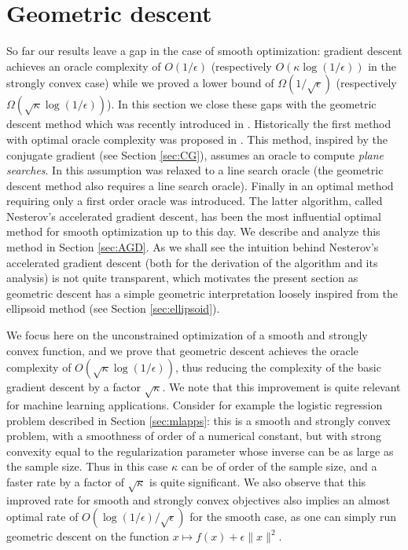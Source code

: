 \section{Geometric descent} \label{sec:GeoD}
So far our results leave a gap in the case of smooth optimization: gradient descent achieves an oracle complexity of $O(1/\epsilon)$ (respectively $O(\kappa \log(1/\epsilon))$ in the strongly convex case) while we proved a lower bound of $\Omega(1/\sqrt{\epsilon})$ (respectively $\Omega(\sqrt{\kappa} \log(1/\epsilon))$). In this section we close these gaps with the geometric descent method which was recently introduced in \cite{BLS15}. Historically the first method with optimal oracle complexity was proposed in \cite{NY83}. This method, inspired by the conjugate gradient (see Section \ref{sec:CG}), assumes an oracle to compute {\em plane searches}. In \cite{Nem82} this assumption was relaxed to a line search oracle (the geometric descent method also requires a line search oracle). Finally in \cite{Nes83} an optimal method requiring only a first order oracle was introduced. The latter algorithm, called Nesterov's accelerated gradient descent, has been the most influential optimal method for smooth optimization up to this day. We describe and analyze this method in Section \ref{sec:AGD}. As we shall see the intuition behind Nesterov's accelerated gradient descent (both for the derivation of the algorithm and its analysis) is not quite transparent, which motivates the present section as geometric descent has a simple geometric interpretation loosely inspired from the ellipsoid method (see Section \ref{sec:ellipsoid}).

We focus here on the unconstrained optimization of a smooth and strongly convex function, and we prove that geometric descent achieves the oracle complexity of $O(\sqrt{\kappa} \log(1/\epsilon))$, thus reducing the complexity of the basic gradient descent by a factor $\sqrt{\kappa}$. We note that this improvement is quite relevant for machine learning applications. Consider for example the logistic regression problem described in Section \ref{sec:mlapps}: this is a smooth and strongly convex problem, with a smoothness of order of a numerical constant, but with strong convexity equal to the regularization parameter whose inverse can be as large as the sample size. Thus in this case $\kappa$ can be of order of the sample size, and a faster rate by a factor of $\sqrt{\kappa}$ is quite significant. We also observe that this improved rate for smooth and strongly convex objectives also implies an almost optimal rate of $O(\log(1/\epsilon) / \sqrt{\epsilon})$ for the smooth case, as one can simply run geometric descent on the function $x \mapsto f(x) + \epsilon \|x\|^2$. 

